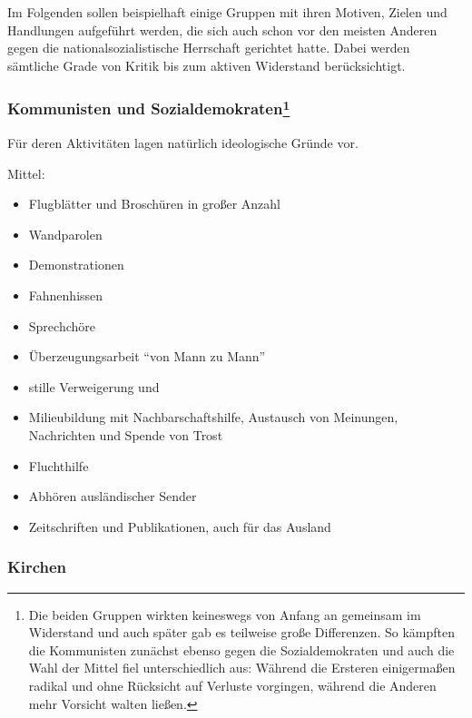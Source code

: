 Im Folgenden sollen beispielhaft einige Gruppen mit ihren Motiven,
Zielen und Handlungen aufgeführt werden, die sich auch schon vor den
meisten Anderen gegen die nationalsozialistische Herrschaft gerichtet
hatte. Dabei werden sämtliche Grade von Kritik bis zum aktiven
Widerstand berücksichtigt.


\subsubsection[Kommunisten und Sozialdemokraten]{Kommunisten und
Sozialdemokraten\footnote{Die beiden Gruppen wirkten keineswegs von
Anfang an gemeinsam im Widerstand und auch später gab es teilweise
große Differenzen. So kämpften die Kommunisten zunächst ebenso gegen
die Sozialdemokraten und auch die Wahl der Mittel fiel unterschiedlich
aus: Während die Ersteren einigermaßen radikal und ohne Rücksicht auf
Verluste vorgingen, während die Anderen mehr Vorsicht walten ließen.}}

Für deren Aktivitäten lagen natürlich ideologische Gründe vor.

\noindent Mittel:

\begin{itemize}
\item Flugblätter und Broschüren in großer Anzahl
\item Wandparolen
\item Demonstrationen
\item Fahnenhissen
\item Sprechchöre
\item Überzeugungsarbeit \enquote{von Mann zu Mann}
\item stille Verweigerung und
\item Milieubildung mit Nachbarschaftshilfe, Austausch von Meinungen,
Nachrichten und Spende von Trost
\item Fluchthilfe
\item Abhören ausländischer Sender
\item Zeitschriften und Publikationen, auch für das Ausland
\end{itemize}


\subsubsection{Kirchen}

